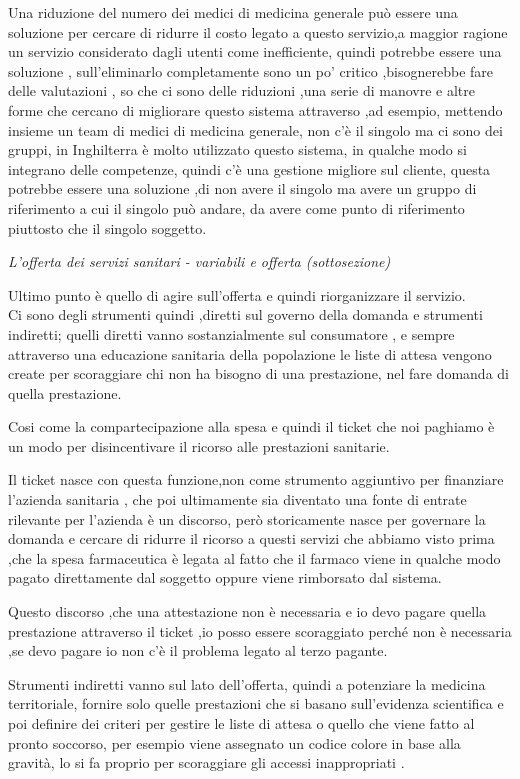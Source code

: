 \documentclass[]{article}
\begin{document}
Una riduzione del numero dei medici di medicina generale può essere una
soluzione per cercare di ridurre il costo legato a questo servizio,a
maggior ragione un servizio considerato dagli utenti come inefficiente,
quindi potrebbe essere una soluzione , sull'eliminarlo completamente
sono un po' critico ,bisognerebbe fare delle valutazioni , so che ci
sono delle riduzioni ,una serie di manovre e altre forme che cercano di
migliorare questo sistema attraverso ,ad esempio, mettendo insieme un
team di medici di medicina generale, non c'è il singolo ma ci sono dei
gruppi, in Inghilterra è molto utilizzato questo sistema, in qualche
modo si integrano delle competenze, quindi c'è una gestione migliore sul
cliente, questa potrebbe essere una soluzione ,di non avere il singolo
ma avere un gruppo di riferimento a cui il singolo può andare, da avere
come punto di riferimento piuttosto che il singolo soggetto.

\emph{L'offerta dei servizi sanitari - variabili e offerta
(sottosezione)}

Ultimo punto è quello di agire sull'offerta e quindi riorganizzare il
servizio.\\
Ci sono degli strumenti quindi ,diretti sul governo della domanda e
strumenti indiretti; quelli diretti vanno sostanzialmente sul
consumatore , e sempre attraverso una educazione sanitaria della
popolazione le liste di attesa vengono create per scoraggiare chi non ha
bisogno di una prestazione, nel fare domanda di quella prestazione.

Cosi come la compartecipazione alla spesa e quindi il ticket che noi
paghiamo è un modo per disincentivare il ricorso alle prestazioni
sanitarie.

Il ticket nasce con questa funzione,non come strumento aggiuntivo per
finanziare l'azienda sanitaria , che poi ultimamente sia diventato una
fonte di entrate rilevante per l'azienda è un discorso, però
storicamente nasce per governare la domanda e cercare di ridurre il
ricorso a questi servizi che abbiamo visto prima ,che la spesa
farmaceutica è legata al fatto che il farmaco viene in qualche modo
pagato direttamente dal soggetto oppure viene rimborsato dal sistema.

Questo discorso ,che una attestazione non è necessaria e io devo pagare
quella prestazione attraverso il ticket ,io posso essere scoraggiato
perché non è necessaria ,se devo pagare io non c'è il problema legato al
terzo pagante.

Strumenti indiretti vanno sul lato dell'offerta, quindi a potenziare la
medicina territoriale, fornire solo quelle prestazioni che si basano
sull'evidenza scientifica e poi definire dei criteri per gestire le
liste di attesa o quello che viene fatto al pronto soccorso, per esempio
viene assegnato un codice colore in base alla gravità, lo si fa proprio
per scoraggiare gli accessi inappropriati .
\end{document}
